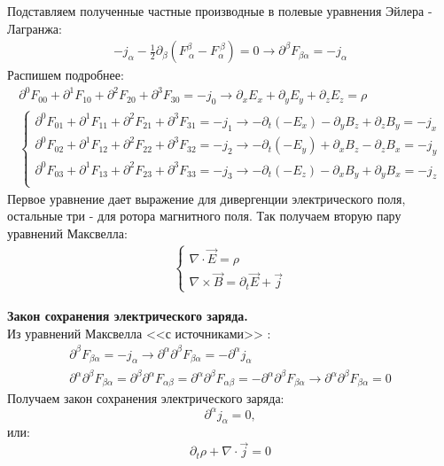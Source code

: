 \documentclass[__main__.tex]{subfiles}
\begin{document}
Подставляем полученные частные производные в полевые уравнения Эйлера - Лагранжа:
\begin{gather*}
-j_\alpha - \frac{1}{2} \partial_\beta\left(F^\beta_{\ \alpha} - F_\alpha^{\ \beta}\right) = 0 \rightarrow \partial^\beta F_{\beta\alpha} = -j_\alpha
\end{gather*}
Распишем подробнее:
\begin{gather*}
\partial^0F_{00} + \partial^1F_{10} + \partial^2 F_{20} + \partial^3F_{30} = -j_0 \rightarrow \partial_x E_x + \partial_y E_y + \partial_z E_z = \rho\\
\begin{cases}
\partial^0F_{01} + \partial^1F_{11} + \partial^2 F_{21} + \partial^3F_{31} = -j_1 \rightarrow -\partial_t(- E_x) - \partial_y B_z + \partial_z B_y = -j_x\\
\partial^0F_{02} + \partial^1F_{12} + \partial^2 F_{22} + \partial^3F_{32} = -j_2 \rightarrow -\partial_t(- E_y) + \partial_x B_z - \partial_z B_x = -j_y\\
\partial^0F_{03} + \partial^1F_{13} + \partial^2 F_{23} + \partial^3F_{33} = -j_3 \rightarrow -\partial_t(- E_z) - \partial_x B_y + \partial_y B_x = -j_z\\
\end{cases}
\end{gather*}
Первое уравнение дает выражение для дивергенции электрического поля, остальные три - для ротора магнитного поля. Так получаем вторую пару уравнений Максвелла:
\begin{gather*}
\begin{cases}
\nabla \cdot \vec E = \rho\\
\nabla \times \vec B = \partial_t \vec E + \vec j
\end{cases}
\end{gather*}

\textbf{Закон сохранения электрического заряда.}\\
Из уравнений Максвелла <<с источниками>> :
\begin{gather*}
\partial^\beta F_{\beta\alpha} = -j_\alpha \longrightarrow \partial^\alpha\partial^\beta F_{\beta\alpha} = -\partial^\alpha j_\alpha\\
\partial^\alpha\partial^\beta F_{\beta\alpha} = \partial^\beta\partial^\alpha F_{\alpha\beta} = \partial^\alpha\partial^\beta F_{\alpha\beta} = - \partial^\alpha\partial^\beta F_{\beta\alpha} \longrightarrow \partial^\alpha\partial^\beta F_{\beta\alpha} = 0
\end{gather*}
Получаем закон сохранения электрического заряда:
$$\partial^\alpha j_\alpha = 0,$$
или:
$$\partial_t\rho + \nabla \cdot \vec j = 0$$
\end{document}
